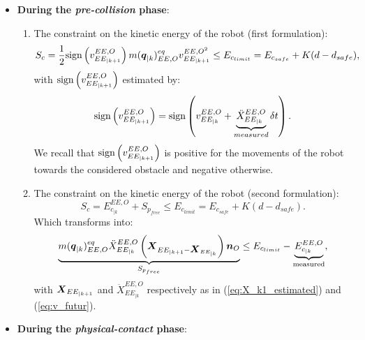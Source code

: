 \begin{itemize}
\item \textbf{During the \textit{pre-collision} phase}: 
\begin{enumerate}
\item The constraint on the kinetic energy of the robot (first formulation):
\begin{equation} 
S_c =  \frac{1}{2} \textnormal{sign}\left(v_{EE_{|k+1}}^{EE,O}\right) m(\mbox{\boldmath${q}$}_{|k})_{EE,O}^{eq} v_{EE_{|k+1}}^{{EE,O}^2} \leq E_{c_{limit}} = E_{c_{safe}} +  K (d - d_{safe}),
\label{eq:Safe_constr_1}
\end{equation}
with $\textnormal{sign}\left(v_{EE_{|k+1}}^{EE,O}\right)$ estimated by:
\begin{equation} 
\textnormal{sign}\left(v_{EE_{|k+1}}^{EE,O}\right) = \textnormal{sign}\left(v_{EE_{|k}}^{EE,O}+\underbrace{\ddot{X}_{EE_{|k}}^{EE,O}}_{measured} \delta t\right). 
\label{eq:sign_estimation}
\end{equation}
We recall that $\textnormal{sign}\left(v_{EE_{|k+1}}^{EE,O}\right)$ is positive for the movements of the robot towards the considered obstacle and negative otherwise.
\item The constraint on the kinetic energy of the robot (second formulation): 
\begin{equation} 
S_c =  E_{c_{|k}}^{EE,O} + S_{p_{free}} \leq E_{c_{limit}} = E_{c_{safe}} +  K (d - d_{safe}).
\label{eq:Safe_constr_2}
\end{equation}
Which transforms into: 
\begin{equation} 
\underbrace{m(\mbox{\boldmath${q}$}_{|k})_{EE,O}^{eq} \ddot{X}_{EE_{|k}}^{EE,O}  \left(\mbox{\boldmath${X}$}_{EE_{|k+1} - \mbox{\boldmath${X}$}_{EE_{|k}}}\right) \mbox{\boldmath${n}$}_O}_{S_{p_{free}}} \leq E_{c_{limit}} - \underbrace{E_{c_{|k}}^{EE,O}}_{\textnormal{measured}},
\label{eq:Safe_constr_2_bis}
\end{equation}        
with $\mbox{\boldmath${X}$}_{EE_{|k+1}}$ and $\ddot{X}_{EE_{|k}}^{EE,O}$ respectively as in (\ref{eq:X_k1_estimated}) and (\ref{eq:v_futur}). 
\end{enumerate}
\item \textbf{During the \textit{physical-contact} phase}: 
\begin{equation} 

\end{equation}
\end{itemize}
